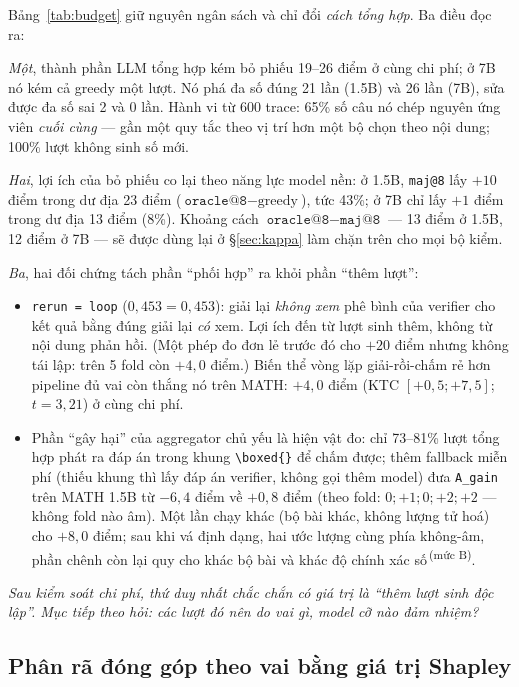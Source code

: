 \documentclass[11pt,a4paper]{article}
\newcommand{\mucB}{\textsuperscript{\,(mức B)}}
\begin{document}
Bảng~\ref{tab:budget} giữ nguyên ngân sách và chỉ đổi \emph{cách tổng hợp}. Ba điều đọc ra:

\emph{Một}, thành phần LLM tổng hợp kém bỏ phiếu 19--26 điểm ở cùng chi phí; ở 7B nó kém cả
greedy một lượt. Nó phá đa số đúng 21 lần (1.5B) và 26 lần (7B), sửa được đa số sai 2 và 0 lần.
Hành vi từ 600 trace: 65\% số câu nó chép nguyên ứng viên \emph{cuối cùng} --- gần một quy tắc
theo vị trí hơn một bộ chọn theo nội dung; 100\% lượt không sinh số mới.

\emph{Hai}, lợi ích của bỏ phiếu co lại theo năng lực model nền: ở 1.5B, \texttt{maj@8} lấy
$+10$ điểm trong dư địa 23 điểm ($\texttt{oracle@8}-\text{greedy}$), tức 43\%; ở 7B chỉ lấy
$+1$ điểm trong dư địa 13 điểm (8\%). Khoảng cách $\texttt{oracle@8}-\texttt{maj@8}$ --- 13
điểm ở 1.5B, 12 điểm ở 7B --- sẽ được dùng lại ở \S\ref{sec:kappa} làm chặn trên cho mọi bộ
kiểm.

\emph{Ba}, hai đối chứng tách phần ``phối hợp'' ra khỏi phần ``thêm lượt'':
\begin{itemize}\itemsep2pt
\item \texttt{rerun = loop} ($0{,}453 = 0{,}453$): giải lại \emph{không xem} phê bình của
      verifier cho kết quả bằng đúng giải lại \emph{có} xem. Lợi ích đến từ lượt sinh thêm,
      không từ nội dung phản hồi. (Một phép đo đơn lẻ trước đó cho $+20$ điểm nhưng không tái
      lập: trên 5 fold còn $+4{,}0$ điểm.) Biến thể vòng lặp giải-rồi-chấm rẻ hơn pipeline đủ
      vai còn thắng nó trên MATH: $+4{,}0$ điểm (KTC $[+0{,}5;+7{,}5]$; $t=3{,}21$) ở cùng chi
      phí.
\item Phần ``gây hại'' của aggregator chủ yếu là hiện vật đo: chỉ 73--81\% lượt tổng hợp phát
      ra đáp án trong khung \verb|\boxed{}| để chấm được; thêm fallback miễn phí (thiếu khung
      thì lấy đáp án verifier, không gọi thêm model) đưa \texttt{A\_gain} trên MATH 1.5B từ
      $-6{,}4$ điểm về $+0{,}8$ điểm (theo fold: $0; +1; 0; +2; +2$ --- không fold nào âm). Một
      lần chạy khác (bộ bài khác, không lượng tử hoá) cho $+8{,}0$ điểm; sau khi vá định dạng,
      hai ước lượng cùng phía không-âm, phần chênh còn lại quy cho khác bộ bài và khác độ chính
      xác số\mucB.
\end{itemize}

\emph{Sau kiểm soát chi phí, thứ duy nhất chắc chắn có giá trị là ``thêm lượt sinh độc lập''.
Mục tiếp theo hỏi: các lượt đó nên do vai gì, model cỡ nào đảm nhiệm?}

\subsection{Phân rã đóng góp theo vai bằng giá trị Shapley}\label{sec:shapley}
\end{document}
